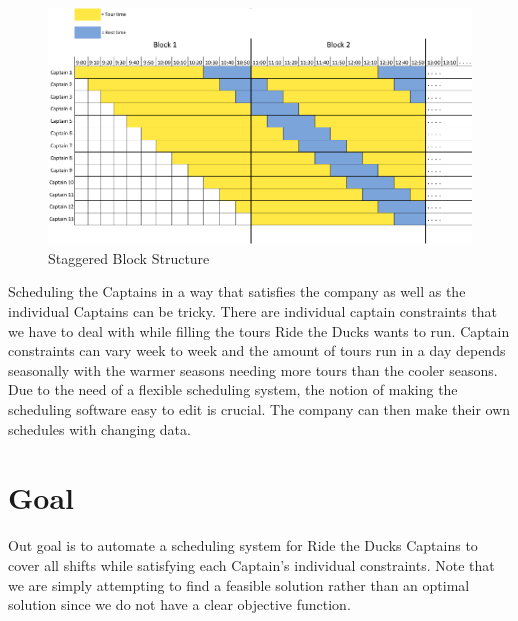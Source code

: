 \documentclass[12pt]{article}
\begin{document}
\begin{figure}[h!]
\centering
\includegraphics[scale=0.7]{block_figure2.png}
\caption{Staggered Block Structure}

\end{figure}

Scheduling the Captains in a way that satisfies the company as well as the 
individual Captains can be tricky. There are individual captain constraints that we have to deal with while filling the tours Ride the Ducks wants to run. Captain constraints can vary week to week and the amount of tours run in a day depends seasonally with the warmer seasons needing more tours than the cooler seasons. Due to the need of a flexible scheduling system, the notion of making the scheduling software easy to edit is crucial. The company can then 
make their own schedules with changing data. 

\section*{Goal}
Out goal is to automate a scheduling system for Ride the Ducks Captains to cover all shifts while satisfying each Captain's individual constraints. Note that we are simply attempting to find a feasible solution rather than an optimal solution since we do not have a clear objective function. %
\end{document}
